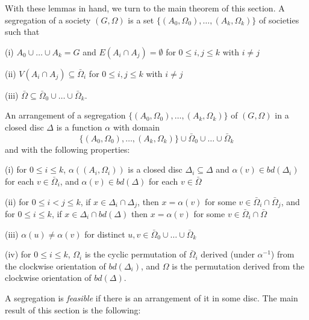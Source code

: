 With these lemmas in hand, we turn to the main theorem of this section. A segregation of a society $(G, \Omega)$ is a set $\{(A_0, \Omega_0), \dots, (A_k, \Omega_k)\}$ of societies such that

\hspace*{12pt}(i) $A_0 \cup \dots \cup A_k = G$ and $E(A_i \cap A_j) = \emptyset$ for $0 \le i, j \le k$ with $i \neq j$

\hspace*{12pt}(ii) $V(A_i \cap A_j) \subseteq \bar{\Omega}_i$ for $0 \le i, j \le k$ with $i \neq j$

\hspace*{12pt}(iii) $\bar{\Omega} \subseteq \bar{\Omega}_0 \cup \dots \cup \bar{\Omega}_k$.

An arrangement of a segregation $\{(A_0, \Omega_0), \dots, (A_k, \Omega_k)\}$ of $(G, \Omega)$ in a closed disc $\Delta$ is a function $\alpha$ with domain
\begin{equation*}
\{(A_0, \Omega_0), \dots, (A_k, \Omega_k)\} \cup \bar{\Omega}_0 \cup \dots \cup \bar{\Omega}_k
\end{equation*}
and with the following properties:

\hspace*{12pt}(i) for $0 \le i \le k$, $\alpha((A_i, \Omega_i))$ is a closed disc $\Delta_i \subseteq \Delta$ and $\alpha(v) \in bd(\Delta_i)$ for each $v \in \bar{\Omega}_i$, and $\alpha(v) \in bd(\Delta)$ for each $v \in \bar{\Omega}$

\hspace*{12pt}(ii) for $0 \le i < j \le k$, if $x \in \Delta_i \cap \Delta_j$, then $x = \alpha(v)$ for some $v \in \bar{\Omega}_i \cap \bar{\Omega}_j$, and for $0 \le i \le k$, if $x \in \Delta_i \cap bd(\Delta)$ then $x = \alpha(v)$ for some $v \in \bar{\Omega}_i \cap \bar{\Omega}$

\hspace*{12pt}(iii) $\alpha(u) \neq \alpha(v)$ for distinct $u, v \in \bar{\Omega}_0 \cup \dots \cup \bar{\Omega}_k$

\hspace*{12pt}(iv) for $0 \le i \le k$, $\Omega_i$ is the cyclic permutation of $\bar{\Omega}_i$ derived (under $\alpha^{-1}$) from the clockwise orientation of $bd(\Delta_i)$, and $\Omega$ is the permutation derived from the clockwise orientation of $bd(\Delta)$.

A segregation is \textit{feasible} if there is an arrangement of it in some disc. The main result of this section is the following:

